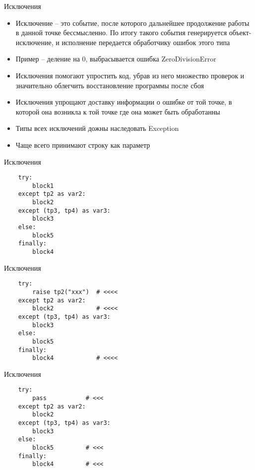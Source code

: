 \documentclass{article}
\begin{document}
\begin{center} Исключения \end{center}
\begin{itemize}
	\item Исключение – это событие, после которого дальнейшее продолжение 
			работы в данной точке бессмысленно. По итогу такого события 
			генерируется объект-исключение, и исполнение передается обработчику 
			ошибок этого типа
	\item Пример – деление на 0, выбрасывается ошибка ZeroDivisionError
	\item Исключения помогают упростить код, убрав из него множество 
			проверок и значительно облегчить восстановление программы после сбоя
	\item Исключения упрощают доставку информации о ошибке от той точке, 
			в которой она возникла к той точке где она может быть обработанны
	\item Типы всех исключений дожны наследовать Exception
	\item Чаще всего принимают строку как параметр
\end{itemize}
\newpage


\begin{center} Исключения \end{center}
\begin{lstlisting}
	try:
		block1
	except tp2 as var2:
		block2
	except (tp3, tp4) as var3:
		block3
	else:
		block5
	finally:
		block4

\end{lstlisting}
\newpage

\begin{center} Исключения \end{center}
\begin{lstlisting}
	try:
		raise tp2("xxx")  # <<<<
	except tp2 as var2:
		block2            # <<<<
	except (tp3, tp4) as var3:
		block3
	else:
		block5
	finally:
		block4            # <<<<
\end{lstlisting}
\newpage

\begin{center} Исключения \end{center}
\begin{lstlisting}
	try:
		pass           # <<<
	except tp2 as var2:
		block2
	except (tp3, tp4) as var3:
		block3
	else:
		block5         # <<<
	finally:
		block4         # <<<
\end{lstlisting}
\newpage
\end{document}

